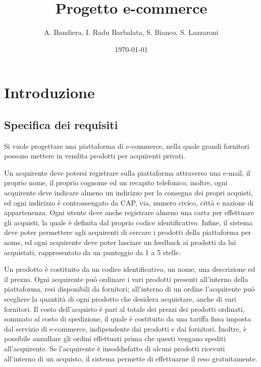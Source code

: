 \documentclass[12pt]{report}
\begin{document}
    \renewcommand{\labelenumii}{\arabic{enumi}.\arabic{enumii}}
    \renewcommand{\labelenumiii}{\arabic{enumi}.\arabic{enumii}.\arabic{enumiii}}
    \renewcommand{\labelenumiv}{\arabic{enumi}.\arabic{enumii}.\arabic{enumiii}.\arabic{enumiv}}

    \title{Progetto e-commerce}
    \author{A. Bandiera, I. Radu Barbalata, S. Bianco, S. Lazzaroni}
    \date{\today}

    \maketitle
    \tableofcontents
    \newpage

    \chapter{Introduzione}

    \section{Specifica dei requisiti}

    Si vuole progettare una piattaforma di e-commerce, nella quale grandi fornitori possono mettere in vendita prodotti per acquirenti privati.

    Un acquirente deve potersi registrare sulla piattaforma attraverso una e-mail, il proprio nome, il proprio cognome ed un recapito telefonico; inoltre, ogni acquirente deve indicare almeno un indirizzo per la consegna dei propri acquisti, ed ogni indirizzo è contrassengato da CAP, via, numero civico, città e nazione di appartenenza. Ogni utente deve anche registrare almeno una carta per effettuare gli acquisti, la quale è definita dal proprio codice identificativo. Infine, il sistema deve poter permettere agli acquirenti di cercare i prodotti della piattaforma per nome, ed ogni acquirente deve poter lasciare un feedback ai prodotti da lui acquistati, rappresentato da un punteggio da 1 a 5 stelle.

    Un prodotto è costituito da un codice identificativo, un nome, una descrizione ed il prezzo. Ogni acquirente può ordinare i vari prodotti presenti all'interno della piattaforma, resi disponibili da fornitori; all'interno di un ordine l'acquirente può scegliere la quantità di ogni prodotto che desidera acquistare, anche di vari fornitori. Il costo dell'acquisto è pari al totale dei prezzi dei prodotti ordinati, sommato al costo di spedizione, il quale è costituito da una tariffa fissa imposta dal servizio di e-commerce, indipendente dai prodotti e dai fornitori. Inoltre, è possibile annullare gli ordini effettuati prima che questi vengano spediti all'acquirente. Se l'acquirente è insoddisfatto di alcuni prodotti ricevuti all'interno di un acquisto, il sistema permette di effettuarne il reso gratuitamente.
\end{document}

